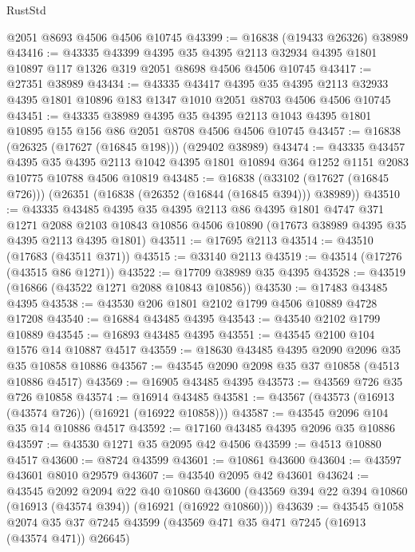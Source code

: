 \begin{lexlean}{RustStd}
\begin{coremodule}
    @2051
    @8693
    @4506
    @4506
    @10745
@43399 := @16838 (@19433 @26326) @38989
@43416 := @43335
    @43399
    @4395
    @35
    @4395
    @2113
    @32934
    @4395
    @1801
    @10897
    @117
    @1326
    @319
    @2051
    @8698
    @4506
    @4506
    @10745
@43417 := @27351 @38989
@43434 := @43335
    @43417
    @4395
    @35
    @4395
    @2113
    @32933
    @4395
    @1801
    @10896
    @183
    @1347
    @1010
    @2051
    @8703
    @4506
    @4506
    @10745
@43451 := @43335
    @38989
    @4395
    @35
    @4395
    @2113
    @1043
    @4395
    @1801
    @10895
    @155
    @156
    @86
    @2051
    @8708
    @4506
    @4506
    @10745
@43457 := @16838 (@26325 (@17627 (@16845 @198))) (@29402 @38989)
@43474 := @43335
    @43457
    @4395
    @35
    @4395
    @2113
    @1042
    @4395
    @1801
    @10894
    @364
    @1252
    @1151
    @2083
    @10775
    @10788
    @4506
    @10819
@43485 := @16838
    (@33102 (@17627 (@16845 @726)))
    (@26351 (@16838 (@26352 (@16844 (@16845 @394))) @38989))
@43510 := @43335
    @43485
    @4395
    @35
    @4395
    @2113
    @86
    @4395
    @1801
    @4747
    @371
    @1271
    @2088
    @2103
    @10843
    @10856
    @4506
    @10890
    (@17673 @38989 @4395 @35 @4395 @2113 @4395 @1801)
@43511 := @17695 @2113
@43514 := @43510 (@17683 (@43511 @371))
@43515 := @33140 @2113
@43519 := @43514 (@17276 (@43515 @86 @1271))
@43522 := @17709 @38989 @35 @4395
@43528 := @43519 (@16866 (@43522 @1271 @2088 @10843 @10856))
@43530 := @17483 @43485 @4395
@43538 := @43530 @206 @1801 @2102 @1799 @4506 @10889 @4728 @17208
@43540 := @16884 @43485 @4395
@43543 := @43540 @2102 @1799 @10889
@43545 := @16893 @43485 @4395
@43551 := @43545 @2100 @104 @1576 @14 @10887 @4517
@43559 := @18630 @43485 @4395 @2090 @2096 @35 @35 @10858 @10886
@43567 := @43545 @2090 @2098 @35 @37 @10858 (@4513 @10886 @4517)
@43569 := @16905 @43485 @4395
@43573 := @43569 @726 @35 @726 @10858
@43574 := @16914 @43485
@43581 := @43567 (@43573 (@16913 (@43574 @726)) (@16921 (@16922 @10858)))
@43587 := @43545 @2096 @104 @35 @14 @10886 @4517
@43592 := @17160 @43485 @4395 @2096 @35 @10886
@43597 := @43530 @1271 @35 @2095 @42 @4506
@43599 := @4513 @10880 @4517
@43600 := @8724 @43599
@43601 := @10861 @43600
@43604 := @43597 @43601 @8010 @29579
@43607 := @43540 @2095 @42 @43601
@43624 := @43545
    @2092
    @2094
    @22
    @40
    @10860
    @43600
    (@43569 @394 @22 @394 @10860 (@16913 (@43574 @394)) (@16921 (@16922 @10860)))
@43639 := @43545
    @1058
    @2074
    @35
    @37
    @7245
    @43599
    (@43569 @471 @35 @471 @7245 (@16913 (@43574 @471)) @26645)

\end{coremodule}
\end{lexlean}
